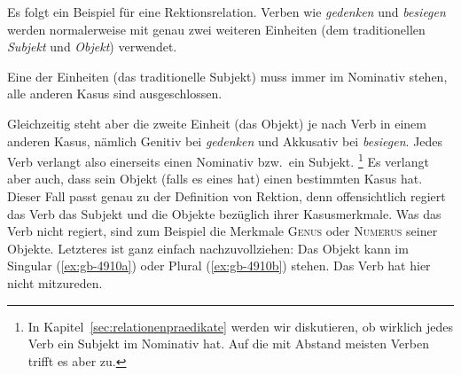 \Stretch[0.5]



Es folgt ein Beispiel für eine Rektionsrelation.
Verben wie \textit{gedenken} und \textit{besiegen} werden normalerweise mit genau zwei weiteren Einheiten (dem traditionellen \textit{Subjekt} und \textit{Objekt}) verwendet.

\begin{exe}
\end{exe}

Eine der Einheiten (das traditionelle Subjekt) muss immer im Nominativ stehen, alle anderen Kasus sind ausgeschlossen.

\begin{exe}
  \ex
  \begin{xlist}
  \end{xlist}
\end{exe}

Gleichzeitig steht aber die zweite Einheit (das Objekt) je nach Verb in einem anderen Kasus, nämlich Genitiv bei \textit{gedenken} und Akkusativ bei \textit{besiegen}.
Jedes Verb verlangt also einerseits einen Nominativ bzw.\ ein Subjekt.%
\footnote{In Kapitel~\ref{sec:relationenpraedikate} werden wir diskutieren, ob wirklich jedes Verb ein Subjekt im Nominativ hat.
Auf die mit Abstand meisten Verben trifft es aber zu.}
Es verlangt aber auch, dass sein Objekt (falls es eines hat) einen bestimmten Kasus hat.
Dieser Fall passt genau zu der Definition von Rektion, denn offensichtlich regiert das Verb das Subjekt und die Objekte bezüglich ihrer Kasusmerkmale.
Was das Verb nicht regiert, sind zum Beispiel die Merkmale \textsc{Genus} oder \textsc{Numerus} seiner Objekte.
Letzteres ist ganz einfach nachzuvollziehen:
Das Objekt kann im Singular (\ref{ex:gb-4910a}) oder Plural (\ref{ex:gb-4910b}) stehen.
Das Verb hat hier nicht mitzureden.

\begin{exe}
  \ex
  \begin{xlist}
  \end{xlist}
\end{exe}

